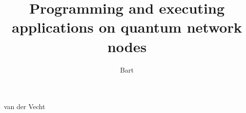 \documentclass{propositions}
\begin{document}
\title{Programming and executing applications on quantum network nodes}
\author{Bart}{van der Vecht}



\clearpage
{

}
\end{document}
